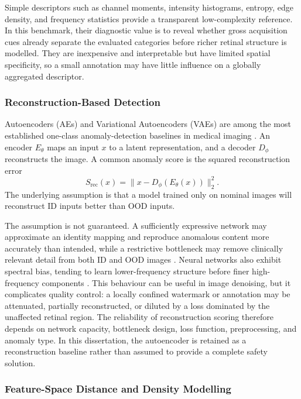 \documentclass[fleqn,12pt]{olplainarticle}
\begin{document}
Simple descriptors such as channel moments, intensity histograms, entropy,
edge density, and frequency statistics provide a transparent low-complexity
reference. In this benchmark, their diagnostic value is to reveal whether
gross acquisition cues already separate the evaluated categories before richer
retinal structure is modelled. They are inexpensive and interpretable but have
limited spatial specificity, so a small annotation may have little influence
on a globally aggregated descriptor.

\subsubsection{Reconstruction-Based Detection}

Autoencoders (AEs) and Variational Autoencoders (VAEs) are among the most established one-class anomaly-detection baselines in medical imaging \cite{baur2021autoencoders}. An encoder $E_{\theta}$ maps an input $x$ to a latent representation, and a decoder $D_{\phi}$ reconstructs the image. A common anomaly score is the squared reconstruction error
\begin{equation}
    S_{\mathrm{rec}}(x)=\lVert x-D_{\phi}(E_{\theta}(x))\rVert_2^2.
    \label{eq:reconstruction_score}
\end{equation}
The underlying assumption is that a model trained only on nominal images will reconstruct ID inputs better than OOD inputs.

The assumption is not guaranteed. A sufficiently expressive network may approximate an identity mapping and reproduce anomalous content more accurately than intended, while a restrictive bottleneck may remove clinically relevant detail from both ID and OOD images \cite{zavrtanik2021reconstruction,heer2021oodblindspot}. Neural networks also exhibit spectral bias, tending to learn lower-frequency structure before finer high-frequency components \cite{rahaman2019spectral}. This behaviour can be useful in image denoising, but it complicates quality control: a locally confined watermark or annotation may be attenuated, partially reconstructed, or diluted by a loss dominated by the unaffected retinal region. The reliability of reconstruction scoring therefore depends on network capacity, bottleneck design, loss function, preprocessing, and anomaly type. In this dissertation, the autoencoder is retained as a reconstruction baseline rather than assumed to provide a complete safety solution.

\subsubsection{Feature-Space Distance and Density Modelling}
\end{document}
